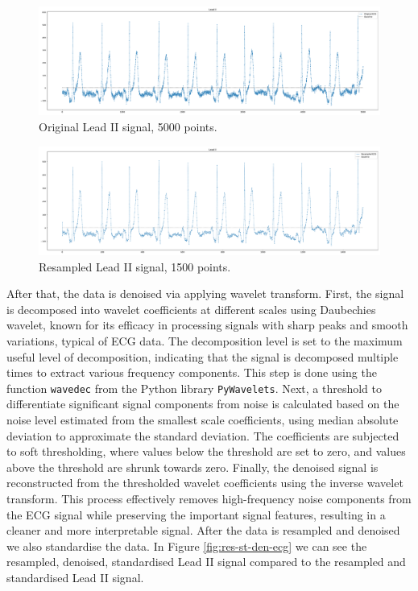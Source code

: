 \documentclass{mldsmsc}
\begin{document}
\begin{figure}[h]
\centering
\includegraphics[width=1\linewidth]{images/r_peaks/original_ecg_m.pdf}
\caption{Original Lead II signal, 5000 points.}
\label{fig:orig-ecg}
\end{figure}

\begin{figure}[h]
\centering
\includegraphics[width=1\linewidth]{images/r_peaks/resampled_ecg_m.pdf}
\caption{Resampled Lead II signal, 1500 points.}
\label{fig:resampled-ecg}
\end{figure}

\noindent After that, the data is denoised via applying wavelet transform. First, the signal is decomposed into wavelet coefficients at different scales using Daubechies wavelet, known for its efficacy in processing signals with sharp peaks and smooth variations, typical of ECG data. The decomposition level is set to the maximum useful level of decomposition, indicating that the signal is decomposed multiple times to extract various frequency components. This step is done using the function \texttt{wavedec} from the Python library \texttt{PyWavelets}. Next, a threshold to differentiate significant signal components from noise is calculated based on the noise level estimated from the smallest scale coefficients, using median absolute deviation to approximate the standard deviation. The coefficients are subjected to soft thresholding, where values below the threshold are set to zero, and values above the threshold are shrunk towards zero. Finally, the denoised signal is reconstructed from the thresholded wavelet coefficients using the inverse wavelet transform. This process effectively removes high-frequency noise components from the ECG signal while preserving the important signal features, resulting in a cleaner and more interpretable signal. After the data is resampled and denoised we also standardise the data. In Figure \ref{fig:res-st-den-ecg} we can see the resampled, denoised, standardised Lead II signal compared to the resampled and standardised Lead II signal. \newline
\end{document}
